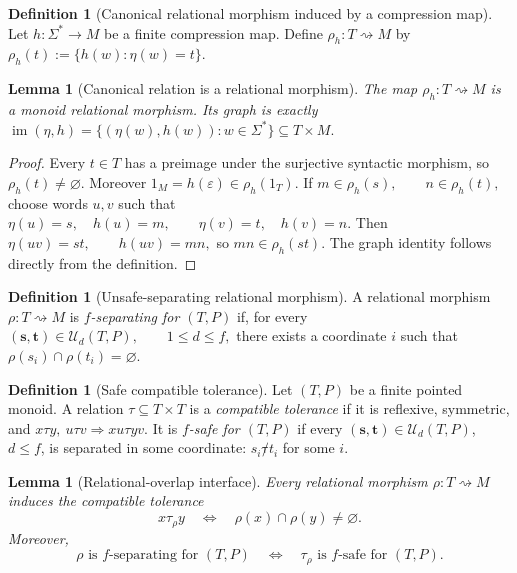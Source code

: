 \documentclass[10pt,a4paper]{article}
\newtheorem{lemma}[theorem]{Lemma}
\theoremstyle{definition}
\newtheorem{definition}[theorem]{Definition}
\theoremstyle{remark}
\newcommand{\relto}{\mathrel{\rightsquigarrow}}
\begin{document}
\begin{definition}[Canonical relational morphism induced by a compression map]
Let \(h:\Sigma^*\to M\) be a finite compression map.
Define \(\rho_h:T\relto M\) by \(\rho_h(t) := \{h(w):\eta(w)=t\}.\) \end{definition}

\begin{lemma}[Canonical relation is a relational morphism]
\label{alg:lem:canonical-rel}
The map \(\rho_h:T\relto M\) is a monoid relational morphism.
Its graph is exactly
\(
\operatorname{im}(\eta,h)
=
\{(\eta(w),h(w)):w\in\Sigma^*\}
\subseteq T\times M.
\)
\end{lemma}

\begin{proof}
Every \(t\in T\) has a preimage under the surjective syntactic morphism, so
\(\rho_h(t)\neq\varnothing\).
Moreover
\(1_M=h(\varepsilon)\in\rho_h(1_T).\)
If
\(m\in\rho_h(s), \qquad n\in\rho_h(t),\)
choose words \(u,v\) such that
\(\eta(u)=s,\quad h(u)=m, \qquad \eta(v)=t,\quad h(v)=n.\)
Then \(\eta(uv)=st, \qquad h(uv)=mn,\) so \(mn\in\rho_h(st).\) The graph identity follows directly from the definition.
\end{proof}

\begin{definition}[Unsafe-separating relational morphism]
\label{alg:def:rel-separating}
A relational morphism \(\rho:T\relto M\) is \emph{\(f\)-separating for \((T,P)\)} if, for every
\(
(\mathbf s,\mathbf t)\in\mathcal U_d(T,P),
\qquad
1\le d\le f,
\)
there exists a coordinate \(i\) such that \(\rho(s_i)\cap\rho(t_i)=\varnothing.\) \end{definition}

\begin{definition}[Safe compatible tolerance]
\label{alg:def:safe-tolerance}
Let \((T,P)\) be a finite pointed monoid.  A relation
\(\tau\subseteq T\times T\) is a \emph{compatible tolerance} if it is
reflexive, symmetric, and
\(
x\tau y,\ u\tau v \Longrightarrow xu\tau yv.
\)
It is \emph{\(f\)-safe for \((T,P)\)} if every
\((\mathbf s,\mathbf t)\in\mathcal U_d(T,P)\), \(d\le f\), is separated in
some coordinate: \(s_i\not\tau t_i\) for some \(i\).
\end{definition}

\begin{lemma}[Relational-overlap interface]
\label{alg:lem:relational-overlap}
Every relational morphism \(\rho:T\relto M\) induces the compatible tolerance
\[
 x\tau_\rho y
 \quad\Longleftrightarrow\quad
 \rho(x)\cap\rho(y)\ne\varnothing.
\tag{T}
\]
Moreover,
\[
\rho\text{ is \(f\)-separating for \((T,P)\)}
\quad\Longleftrightarrow\quad
\tau_\rho\text{ is \(f\)-safe for \((T,P)\)}.
\tag{RT}
\]
\end{lemma}
\end{document}
